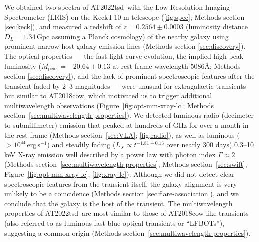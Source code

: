 \documentclass{nature_plusfigure}
\newcommand{\at}{AT2022tsd}
\begin{document}
We obtained two spectra of \at\ with the Low Resolution Imaging Spectrometer (LRIS) on the Keck\,I 10-m telescope (\ref{fig:spec}; Methods section \ref{sec:keck}), and measured\cite{Ho2022_Astronote_Keck} a redshift of $z=0.2564\pm0.0003$ (luminosity distance $D_L=1.34\,$Gpc assuming a Planck cosmology\cite{Planck2020}) of the nearby galaxy using prominent narrow host-galaxy emission lines (Methods section \ref{sec:discovery}). 
The optical properties --- the fast light-curve evolution, the implied high peak luminosity ($M_{\mathrm{peak}}=-20.64\pm0.13$ at rest-frame wavelength 5086\AA; Methods section \ref{sec:discovery}), and the lack of prominent spectroscopic features after the transient faded by 2--3 magnitudes --- were unusual for extragalactic transients but similar to AT2018cow, which motivated us to trigger additional multiwavelength observations (Figure~\ref{fig:opt-mm-xray-lc}; Methods section~\ref{sec:multiwavelength-properties}).
We detected luminous radio (decimeter\cite{Ho2022Astronote_radio} to submillimeter) emission that peaked at hundreds of GHz for over a month in the rest frame (Methods section~\ref{sec:VLA}; \ref{fig:radio}),
as well as luminous ($>10^{44}\,$erg\,s$^{-1}$) and steadily fading ($L_X\propto t^{-1.81\pm0.13}$ over nearly 300 days) 0.3--10\,keV X-ray emission\cite{Schulze2022Astronote_xray} well described by a power law with photon index $\Gamma\approx2$ (Methods section~\ref{sec:multiwavelength-properties}, Methods section~\ref{sec:swift}, Figure~\ref{fig:opt-mm-xray-lc}, \ref{fig:xray-lc}).
Although we did not detect clear spectroscopic features from the transient itself, the galaxy alignment is very unlikely to be a coincidence (Methods section \ref{sec:flare-association}), and we conclude that the galaxy is the host of the transient.
The multiwavelength properties of \at\ are most similar to those of AT2018cow-like transients (also referred to as luminous fast blue optical transients or ``LFBOTs''\cite{Metzger2022}), suggesting a common origin (Methods section~\ref{sec:multiwavelength-properties}).
\end{document}
